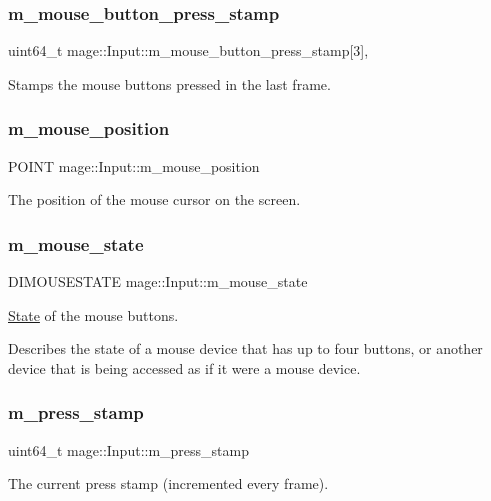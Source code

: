 \subsubsection{\texorpdfstring{m\+\_\+mouse\+\_\+button\+\_\+press\+\_\+stamp}{m\_mouse\_button\_press\_stamp}}
{\footnotesize\ttfamily uint64\+\_\+t mage\+::\+Input\+::m\+\_\+mouse\+\_\+button\+\_\+press\+\_\+stamp\mbox{[}3\mbox{]}\hspace{0.3cm}{\ttfamily [mutable]}, {\ttfamily [protected]}}

Stamps the mouse buttons pressed in the last frame. \hypertarget{classmage_1_1_input_a28b8ec250a8d0d0efe0da713060b8599}{}\label{classmage_1_1_input_a28b8ec250a8d0d0efe0da713060b8599} 
\subsubsection{\texorpdfstring{m\+\_\+mouse\+\_\+position}{m\_mouse\_position}}
{\footnotesize\ttfamily P\+O\+I\+NT mage\+::\+Input\+::m\+\_\+mouse\+\_\+position\hspace{0.3cm}{\ttfamily [protected]}}

The position of the mouse cursor on the screen. \hypertarget{classmage_1_1_input_a14b8cf407e86724f900d2c4385461cfc}{}\label{classmage_1_1_input_a14b8cf407e86724f900d2c4385461cfc} 
\subsubsection{\texorpdfstring{m\+\_\+mouse\+\_\+state}{m\_mouse\_state}}
{\footnotesize\ttfamily D\+I\+M\+O\+U\+S\+E\+S\+T\+A\+TE mage\+::\+Input\+::m\+\_\+mouse\+\_\+state\hspace{0.3cm}{\ttfamily [protected]}}

\hyperlink{classmage_1_1_state}{State} of the mouse buttons.

Describes the state of a mouse device that has up to four buttons, or another device that is being accessed as if it were a mouse device. \hypertarget{classmage_1_1_input_a30ac0d05616daa4211b59d680fae6d76}{}\label{classmage_1_1_input_a30ac0d05616daa4211b59d680fae6d76} 
\subsubsection{\texorpdfstring{m\+\_\+press\+\_\+stamp}{m\_press\_stamp}}
{\footnotesize\ttfamily uint64\+\_\+t mage\+::\+Input\+::m\+\_\+press\+\_\+stamp\hspace{0.3cm}{\ttfamily [protected]}}

The current press stamp (incremented every frame). 